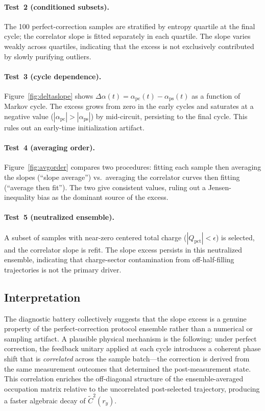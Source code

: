 \documentclass[twocolumn,aps,prx,10pt,floatfix]{revtex4-2}
\begin{document}
\paragraph{Test~2 (conditioned subsets).}
The 100 perfect-correction samples are stratified by entropy quartile
at the final cycle; the correlator slope is fitted separately in each
quartile.  The slope varies weakly across quartiles, indicating that
the excess is not exclusively contributed by slowly purifying outliers.

\paragraph{Test~3 (cycle dependence).}
Figure~\ref{fig:deltaslope} shows $\Delta\alpha(t) = \alpha_\text{pc}(t)
- \alpha_\text{ps}(t)$ as a function of Markov cycle.  The excess grows
from zero in the early cycles and saturates at a negative value
($|\alpha_\text{pc}| > |\alpha_\text{ps}|$) by mid-circuit, persisting
to the final cycle.  This rules out an early-time initialization artifact.

\paragraph{Test~4 (averaging order).}
Figure~\ref{fig:avgorder} compares two procedures: fitting each sample
then averaging the slopes (``slope average'') vs.\ averaging the
correlator curves then fitting (``average then fit'').  The two give
consistent values, ruling out a Jensen-inequality bias as the dominant
source of the excess.

\paragraph{Test~5 (neutralized ensemble).}
A subset of samples with near-zero centered total charge ($|Q_\text{pct}|
< \epsilon$) is selected, and the correlator slope is refit.  The slope
excess persists in this neutralized ensemble, indicating that charge-sector
contamination from off-half-filling trajectories is not the primary driver.

\subsection{Interpretation}

The diagnostic battery collectively suggests that the slope excess is a
genuine property of the perfect-correction protocol ensemble rather than a
numerical or sampling artifact.  A plausible physical mechanism is the
following: under perfect correction, the feedback unitary applied at each
cycle introduces a coherent phase shift that is \emph{correlated} across
the sample batch---the correction is derived from the same measurement
outcomes that determined the post-measurement state.  This correlation
enriches the off-diagonal structure of the ensemble-averaged occupation
matrix relative to the uncorrelated post-selected trajectory, producing a
faster algebraic decay of $\widetilde{C}^2(r_y)$.
\end{document}
